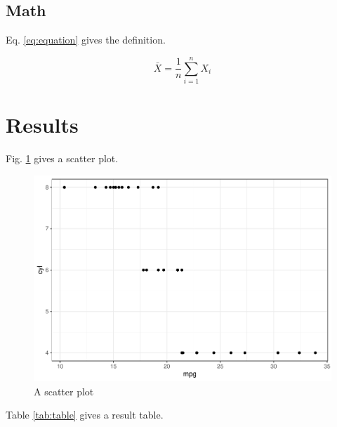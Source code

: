 \documentclass[number]{elsarticle} %
\begin{document}
\hypertarget{math}{%
\subsection{Math}\label{math}}

Eq. \eqref{eq:equation} gives the definition.

\begin{equation}
  \bar{X}=\frac{1}{n}\sum_{i=1}^nX_i
  \label{eq:equation}
\end{equation}

\hypertarget{results}{%
\section{Results}\label{results}}

Fig. \ref{fig:plot} gives a scatter plot.

\begin{figure}[!htb]

{\centering \includegraphics[width=1\linewidth]{figuresplot-1} 

}

\caption{A scatter plot}\label{fig:plot}
\end{figure}

Table \ref{tab:table} gives a result table.
\end{document}
